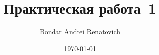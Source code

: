 \documentclass[14pt,a4paper,oneside]{extreport}
\author{Bondar Andrei Renatovich}
\title{Практическая работа \No\,1}
\date{\today}
\begin{document}
\renewcommand{\figurename}{Рисунок}
\renewcommand{\contentsname}{Содержание}


\tableofcontents





\end{document}
